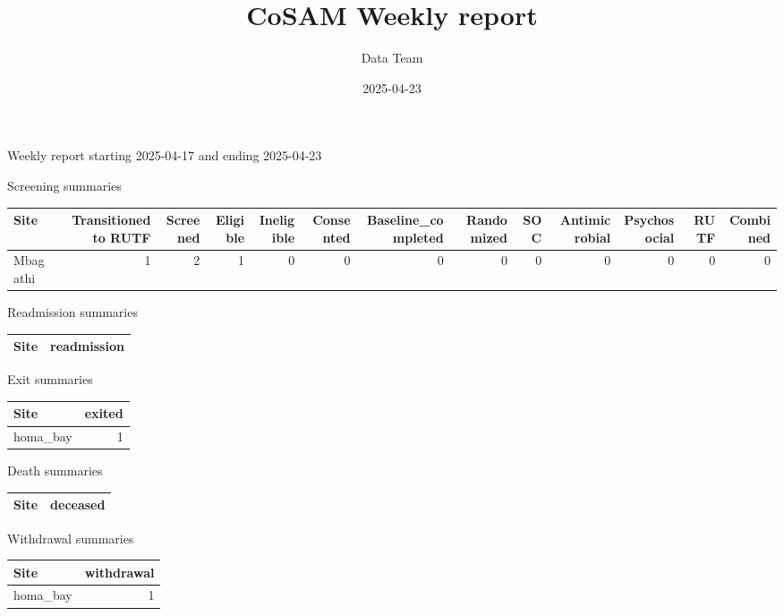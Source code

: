 \documentclass[
]{article}
\title{CoSAM Weekly report}
\author{Data Team}
\date{2025-04-23}
\begin{document}
\maketitle

Weekly report starting 2025-04-17 and ending 2025-04-23

Screening summaries

\begin{table}
\centering
\begin{tabular}[t]{l|r|r|r|r|r|r|r|r|r|r|r|r}
\hline
Site & Transitioned to RUTF & Screened & Eligible & Ineligible & Consented & Baseline\_completed & Randomized & SOC & Antimicrobial & Psychosocial & RUTF & Combined\\
\hline
Mbagathi & 1 & 2 & 1 & 0 & 0 & 0 & 0 & 0 & 0 & 0 & 0 & 0\\
\hline
\end{tabular}
\end{table}

Readmission summaries

\begin{table}
\centering
\begin{tabular}[t]{l|r}
\hline
Site & readmission\\


\hline
\end{tabular}
\end{table}

Exit summaries

\begin{table}
\centering
\begin{tabular}[t]{l|r}
\hline
Site & exited\\
\hline
homa\_bay & 1\\
\hline
\end{tabular}
\end{table}

Death summaries

\begin{table}
\centering
\begin{tabular}[t]{l|r}
\hline
Site & deceased\\


\hline
\end{tabular}
\end{table}

Withdrawal summaries

\begin{table}
\centering
\begin{tabular}[t]{l|r}
\hline
Site & withdrawal\\
\hline
homa\_bay & 1\\
\hline
\end{tabular}
\end{table}
\end{document}
